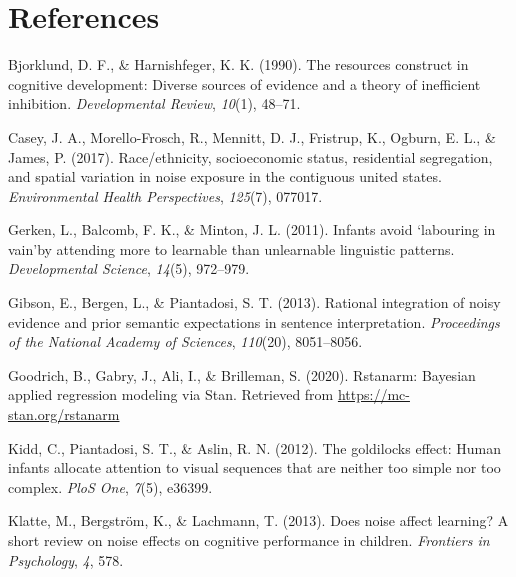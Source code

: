 \documentclass[10pt, letterpaper]{article}
\newenvironment{CSLReferences}%
  {}%
  {\par}
\begin{document}
\hypertarget{references}{%
\section{References}\label{references}}

\setlength{\parindent}{-0.1in} 
\setlength{\leftskip}{0.125in}

\noindent

\hypertarget{refs}{}
\begin{CSLReferences}{1}{0}
\leavevmode{}%
Bjorklund, D. F., \& Harnishfeger, K. K. (1990). The resources construct
in cognitive development: Diverse sources of evidence and a theory of
inefficient inhibition. \emph{Developmental Review}, \emph{10}(1),
48--71.

\leavevmode{}%
Casey, J. A., Morello-Frosch, R., Mennitt, D. J., Fristrup, K., Ogburn,
E. L., \& James, P. (2017). Race/ethnicity, socioeconomic status,
residential segregation, and spatial variation in noise exposure in the
contiguous united states. \emph{Environmental Health Perspectives},
\emph{125}(7), 077017.

\leavevmode{}%
Gerken, L., Balcomb, F. K., \& Minton, J. L. (2011). Infants avoid
`labouring in vain'by attending more to learnable than unlearnable
linguistic patterns. \emph{Developmental Science}, \emph{14}(5),
972--979.

\leavevmode{}%
Gibson, E., Bergen, L., \& Piantadosi, S. T. (2013). Rational
integration of noisy evidence and prior semantic expectations in
sentence interpretation. \emph{Proceedings of the National Academy of
Sciences}, \emph{110}(20), 8051--8056.

\leavevmode{}%
Goodrich, B., Gabry, J., Ali, I., \& Brilleman, S. (2020). Rstanarm:
{Bayesian} applied regression modeling via {Stan}. Retrieved from
\url{https://mc-stan.org/rstanarm}

\leavevmode{}%
Kidd, C., Piantadosi, S. T., \& Aslin, R. N. (2012). The goldilocks
effect: Human infants allocate attention to visual sequences that are
neither too simple nor too complex. \emph{PloS One}, \emph{7}(5),
e36399.

\leavevmode{}%
Klatte, M., Bergström, K., \& Lachmann, T. (2013). Does noise affect
learning? A short review on noise effects on cognitive performance in
children. \emph{Frontiers in Psychology}, \emph{4}, 578.


\end{CSLReferences}
\end{document}
